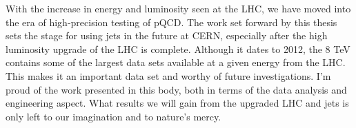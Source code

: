 With the increase in energy and luminosity seen at the LHC, we have moved into the era of high-precision testing of pQCD.  The work set forward by this thesis sets the stage for using jets in the future at CERN, especially after the high luminosity upgrade of the LHC is complete.  Although it dates to 2012, the 8 TeV contains some of the largest data sets available at a given energy from the LHC.  This makes it an important data set and worthy of future investigations.  I'm proud of the work presented in this body, both in terms of the data analysis and engineering aspect.  What results we will gain from the upgraded LHC and jets is only left to our imagination and to nature's mercy.